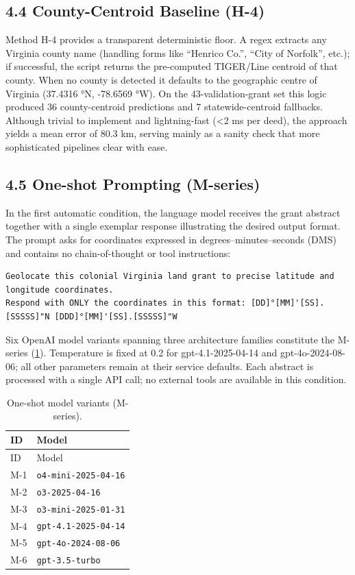\documentclass[
  10pt,
  twocolumn]{article}
\begin{document}
\subsection{4.4 County-Centroid Baseline
(H-4)}\label{county-centroid-baseline-h-4}

Method H-4 provides a transparent deterministic floor. A regex extracts
any Virginia county name (handling forms like ``Henrico Co.'', ``City of
Norfolk'', etc.); if successful, the script returns the pre-computed
TIGER/Line centroid of that county. When no county is detected it
defaults to the geographic centre of Virginia (37.4316 °N, -78.6569 °W).
On the 43-validation-grant set this logic produced 36 county-centroid
predictions and 7 statewide-centroid fallbacks. Although trivial to
implement and lightning-fast (\textless2 ms per deed), the approach
yields a mean error of 80.3 km, serving mainly as a sanity check that
more sophisticated pipelines clear with ease.

\subsection{4.5 One-shot Prompting
(M-series)}\label{one-shot-prompting-m-series}

In the first automatic condition, the language model receives the grant
abstract together with a single exemplar response illustrating the
desired output format. The prompt asks for coordinates expressed in
degrees--minutes--seconds (DMS) and contains no chain-of-thought or tool
instructions:

\begin{lstlisting}
Geolocate this colonial Virginia land grant to precise latitude and longitude coordinates.
Respond with ONLY the coordinates in this format: [DD]°[MM]'[SS].[SSSSS]"N [DDD]°[MM]'[SS].[SSSSS]"W
\end{lstlisting}

Six OpenAI model variants spanning three architecture families
constitute the M-series (\ref{tbl:mmodels}). Temperature is fixed at 0.2
for gpt-4.1-2025-04-14 and gpt-4o-2024-08-06; all other parameters
remain at their service defaults. Each abstract is processed with a
single API call; no external tools are available in this condition.

\begin{longtable}[]{@{}ll@{}}
\caption{\label{tbl:mmodels}One-shot model variants
(M-series).}\tabularnewline
\toprule\noalign{}
ID & Model \\
\midrule\noalign{}
\endfirsthead
\toprule\noalign{}
ID & Model \\
\midrule\noalign{}
\endhead
\bottomrule\noalign{}
\endlastfoot
M-1 & \passthrough{\lstinline!o4-mini-2025-04-16!} \\
M-2 & \passthrough{\lstinline!o3-2025-04-16!} \\
M-3 & \passthrough{\lstinline!o3-mini-2025-01-31!} \\
M-4 & \passthrough{\lstinline!gpt-4.1-2025-04-14!} \\
M-5 & \passthrough{\lstinline!gpt-4o-2024-08-06!} \\
M-6 & \passthrough{\lstinline!gpt-3.5-turbo!} \\
\end{longtable}
\end{document}
